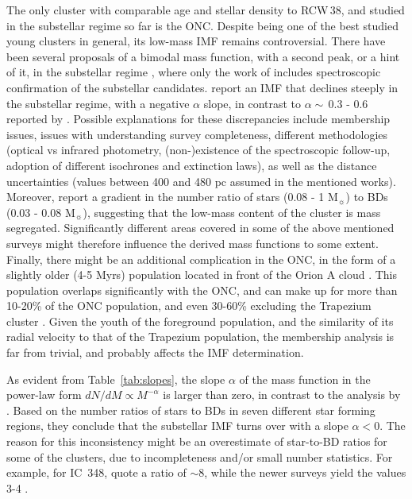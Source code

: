 \documentclass[a4paper,fleqn,usenatbib]{mnras}
\begin{document}
The only cluster with comparable age and stellar density to RCW\,38, and studied in the substellar regime so far is the ONC. 
Despite being one of the best studied young clusters in general, its low-mass IMF remains controversial. 
There have been several proposals of a bimodal mass function, 
with a second peak, or a hint of it,  in the substellar regime \citep{muench02, slesnick04, lucas05, drass16}, 
where only the work of \citet{slesnick04} includes spectroscopic confirmation of the substellar candidates.
\citet{dario12} report an IMF that declines steeply in the substellar regime, with a negative $\alpha$ slope, in contrast to
$\alpha\sim\,$0.3 - 0.6 reported by  \citet{muench02, weights09}. 
Possible explanations for these discrepancies include membership issues, issues with understanding survey completeness, different
 methodologies (optical vs infrared photometry, (non-)existence of the spectroscopic follow-up, adoption of
different isochrones and extinction laws), as well as the distance uncertainties (values between 400 and 480 pc assumed in the mentioned works).
Moreover, \citet{andersen11} report a gradient in the number ratio of stars (0.08 - 1 M$_{\sun}$) to BDs (0.03 - 0.08 M$_{\sun}$),
suggesting that the low-mass content of the cluster is mass segregated. Significantly different areas covered in some of the above mentioned surveys 
 might therefore influence the derived mass functions to some extent.
Finally, there might be an additional complication in the ONC, in the form of a slightly older (4-5 Myrs)
population located in front of the Orion A cloud \citep{alves&bouy12, bouy14}. This population overlaps significantly with the ONC, and can make up for more than
10-20\% of the ONC population, and even 30-60\% excluding the Trapezium cluster \citep{alves&bouy12}.
Given the youth of the foreground population, and the similarity of its radial velocity to that of the Trapezium population,
the membership analysis is far from trivial, and probably affects the IMF determination.

As evident from Table~\ref{tab:slopes}, the slope $\alpha$ of the mass function in the power-law form $dN/dM\propto M^{-\alpha}$ 
is larger than zero, in contrast to the analysis by \citet{andersen08}. Based on the number ratios of stars to BDs in seven different 
star forming regions, they conclude that the substellar IMF turns over with a slope $\alpha < 0$. The reason for this inconsistency might be 
an overestimate of star-to-BD ratios for some of the clusters, due to incompleteness and/or small number statistics. 
For example, for IC~348, \citet{andersen08} quote a ratio of $\sim 8$, while the newer surveys yield the values 3-4 \citep{scholz13}.
\end{document}

